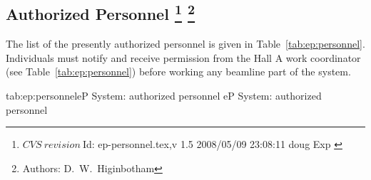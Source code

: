 \begin{safetyen}{0}{0}
\section[Authorized  Personnel]{Authorized  Personnel
\footnote{
   $CVS~revision~ $Id: ep-personnel.tex,v 1.5 2008/05/09 23:08:11 doug Exp $ $
 }
\footnote{Authors: D.~W.~Higinbotham }
}
\end{safetyen}
%
%
The list
of the presently authorized personnel is given in Table~\ref{tab:ep:personnel}.
Individuals must notify and receive permission from
the Hall A work coordinator (see Table~\ref{tab:ep:personnel}) before working any beamline part 
of the system.  
\begin{namestab}{tab:ep:personnel}{eP System: authorized personnel}{%
   eP System: authorized personnel}
\end{namestab}

